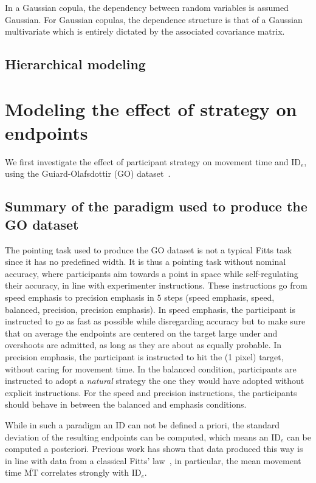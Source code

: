 \documentclass[12pt,a4paper]{article}
\newcommand{\mmt}{\ensuremath{\overline{\text{MT}}}\xspace}
\newcommand{\ide}{\ensuremath{{\text{ID}_e}}\xspace}
\begin{document}
In a Gaussian copula, the dependency between random variables is assumed Gaussian.
For Gaussian copulas, the dependence structure is that of a Gaussian multivariate which is entirely dictated by the associated covariance matrix.


\subsection{Hierarchical modeling}


\section{Modeling the effect of strategy on endpoints \label{sec:strategy_endpoints}}
We first investigate the effect of participant strategy on movement time and \ide, using the Guiard-Olafsdottir (GO) dataset~\cite{guiard2011}.


\subsection{Summary of the paradigm used to produce the GO dataset}
The pointing task used to produce the GO dataset is not a typical Fitts task since it has no predefined width. It is thus a pointing task without nominal accuracy, where participants aim towards a point in space while self-regulating their accuracy, in line with experimenter instructions. These instructions go from speed emphasis to precision emphasis in 5 steps (speed emphasis, speed, balanced, precision, precision emphasis). In speed emphasis, the participant is instructed to go as fast as possible while disregarding accuracy but to make sure that on average the endpoints are centered on the target \ie large under and overshoots are admitted, as long as they are about as equally probable. In precision emphasis, the participant is instructed to hit the (1 pixel) target, without caring for movement time. In the balanced condition, participants are instructed to adopt a \textit{natural} strategy \ie the one they would have adopted without explicit instructions. For the speed and precision instructions, the participants should behave in between the balanced and emphasis conditions.


While in such a paradigm an ID can not be defined a priori, the standard deviation of the resulting endpoints can be computed, which means an \ide can be computed a posteriori. Previous work has shown that data produced this way is in line with data from a classical Fitts' law~\cite{guiard2011, guiard2011b, guiard2015,gori2020}, in particular, the mean movement time \mmt correlates strongly with \ide.
\end{document}
